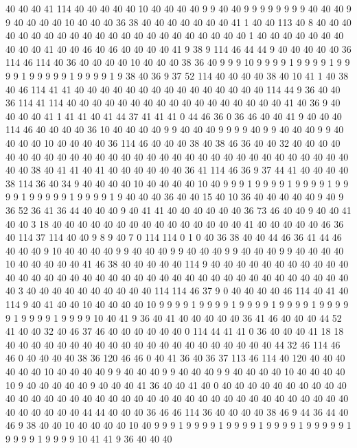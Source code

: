 40 40 40 41 114 40 40 40 40 40 10 40 40 40 40 9 9 40 40 9
9 9 9 9 9 9 9 40 40 40 9 9 40 40 40 40 10 40 40 40
36 38 40 40 40 40 40 40 40 41 1 40 40 113 40 8 40 40 40 40
40 40 40 40 40 40 40 40 40 40 40 40 40 40 40 40 40 40 1 40
40 40 40 40 40 40 40 40 40 41 40 40 46 40 46 40 40 40 40 41
9 38 9 114 46 44 44 9 40 40 40 40 40 36 114 46 114 40 36 40
40 40 40 10 40 40 40 38 36 40 9 9 9 10 9 9 9 9 1 9
9 9 9 1 9 9 9 9 1 9 9 9 9 9 1 9 9 9 9 1
9 38 40 36 9 37 52 114 40 40 40 40 38 40 10 41 1 40 38 40
46 114 41 41 40 40 40 40 40 40 40 40 40 40 40 40 40 40 40 114
44 9 36 40 40 36 114 41 114 40 40 40 40 40 40 40 40 40 40 40
40 40 40 40 40 40 41 40 36 9 40 40 40 40 41 1 41 41 40 41
44 37 41 41 41 0 44 46 36 0 36 46 40 40 41 9 40 40 40 114
46 40 40 40 40 36 10 40 40 40 40 9 9 40 40 40 9 9 9 9
40 9 9 40 40 40 9 9 40 40 40 40 10 40 40 40 40 36 114 46
40 40 40 38 40 38 46 36 40 40 32 40 40 40 40 40 40 40 40 40
40 40 40 40 40 40 40 40 40 40 40 40 40 40 40 40 40 40 40 40
40 40 40 40 38 40 41 41 40 41 40 40 40 40 40 40 36 41 114 46
36 9 37 44 41 40 40 40 40 38 114 36 40 34 9 40 40 40 40 10
40 40 40 40 10 40 9 9 9 1 9 9 9 9 1 9 9 9 9 1
9 9 9 9 1 9 9 9 9 9 1 9 9 9 9 1 9 40 40 40
36 40 40 15 40 10 36 40 40 40 40 40 9 40 9 36 52 36 41 36
44 40 40 40 9 40 41 41 40 40 40 40 40 40 36 73 46 40 40 9
40 40 41 40 40 3 18 40 40 40 40 40 40 40 40 40 40 40 40 40
40 40 41 40 40 40 40 40 46 36 40 114 37 114 40 40 9 8 9 40
7 0 114 114 0 1 0 40 36 38 40 40 44 46 36 41 44 46 40 40
40 9 10 40 40 40 40 9 9 40 40 40 9 9 40 40 40 9 9 40
40 40 9 9 40 40 40 40 10 40 40 40 40 40 41 46 38 40 40 40
40 40 114 9 40 40 40 40 40 40 40 40 40 40 40 40 40 40 40 40
40 40 40 40 40 40 40 40 40 40 40 40 40 40 40 40 40 40 40 40
40 40 40 3 40 40 40 40 40 40 40 40 40 40 114 114 46 37 9 0
40 40 40 40 46 114 40 41 40 114 9 40 41 40 40 10 40 40 40 40
10 9 9 9 9 1 9 9 9 9 1 9 9 9 9 1 9 9 9 9
1 9 9 9 9 9 1 9 9 9 9 1 9 9 9 9 10 40 41 9
36 40 41 40 40 40 40 40 36 41 46 40 40 40 44 52 41 40 40 32
40 46 37 46 40 40 40 40 40 40 0 114 44 41 41 0 36 40 40 40
41 18 18 40 40 40 40 40 40 40 40 40 40 40 40 40 40 40 40 40
40 40 40 40 44 32 46 114 46 46 0 40 40 40 40 38 36 120 46 46
0 40 41 36 40 36 37 113 46 114 40 120 40 40 40 40 40 40 10 40
40 40 40 9 9 40 40 40 9 9 40 40 40 9 9 40 40 40 40 10
40 40 40 40 10 9 40 40 40 40 40 9 40 40 40 41 36 40 40 41
40 0 40 40 40 40 40 40 40 40 40 40 40 40 40 40 40 40 40 40
40 40 40 40 40 40 40 40 40 40 40 40 40 40 40 40 40 40 40 40
40 40 40 40 40 44 44 40 40 40 36 46 46 114 36 40 40 40 40 38
46 9 44 36 44 40 46 9 38 40 40 10 40 40 40 40 10 40 9 9
9 1 9 9 9 9 1 9 9 9 9 1 9 9 9 9 1 9 9 9
9 9 1 9 9 9 9 1 9 9 9 9 10 41 41 9 36 40 40 40
